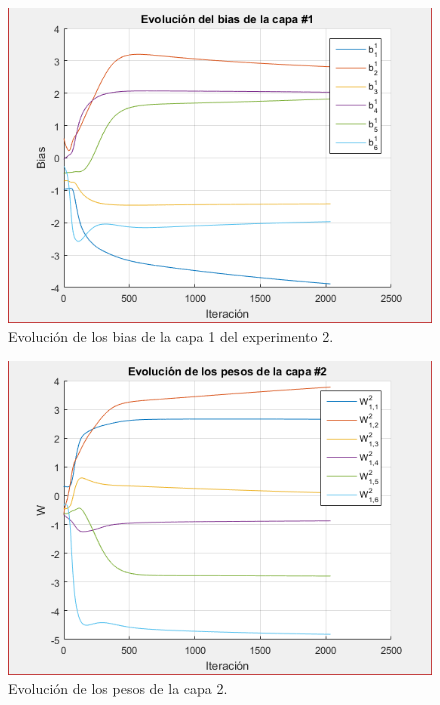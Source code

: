 \begin{figure}[H]
    \begin{center}
        \includegraphics[width=13cm]{2/bias1.png}
        \caption{Evolución de los bias de la capa 1 del experimento 2.}
        \label{fig:bias3}
    \end{center}
\end{figure}

\begin{figure}[H]
    \begin{center}
        \includegraphics[width=13cm]{2/pesos2.png}
        \caption{Evolución de los pesos de la capa 2.}
        \label{fig:pesos4}
    \end{center}
\end{figure}

